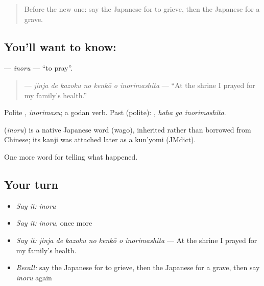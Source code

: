 \label{lesson:JA-C291-inoru}



\begin{quote}
Before the new one: say the Japanese for to grieve, then the Japanese for a grave.
\end{quote}

\subsection*{You'll want to know: }
\textbf{} — \emph{inoru} — \textquotedblleft{}to pray\textquotedblright{}.

\begin{quote}
\textbf{   } — \emph{jinja de kazoku no kenkō o inorimashita} — \textquotedblleft{}At the shrine I prayed for my family's health.\textquotedblright{}
\end{quote}

Polite \textbf{}, \emph{inorimasu}; a godan verb. Past (polite): \textbf{ }, \emph{haha ga inorimashita}.

\begin{cousinweb}
\textbf{} (\emph{inoru}) is a native Japanese word (wago), inherited rather than borrowed from Chinese; its kanji was attached later as a kun'yomi (JMdict).
\end{cousinweb}

\begin{grammarlens}[title={What you've built}]
One more word for telling what happened.
\end{grammarlens}

\subsection*{Your turn}
\begin{itemize}
\raggedright
  \item \emph{Say it:} \emph{inoru}
  \item \emph{Say it:} \emph{inoru}, once more
  \item \emph{Say it:} \emph{jinja de kazoku no kenkō o inorimashita} — At the shrine I prayed for my family's health.
  \item \emph{Recall:} say the Japanese for to grieve, then the Japanese for a grave, then say \emph{inoru} again
\end{itemize}

